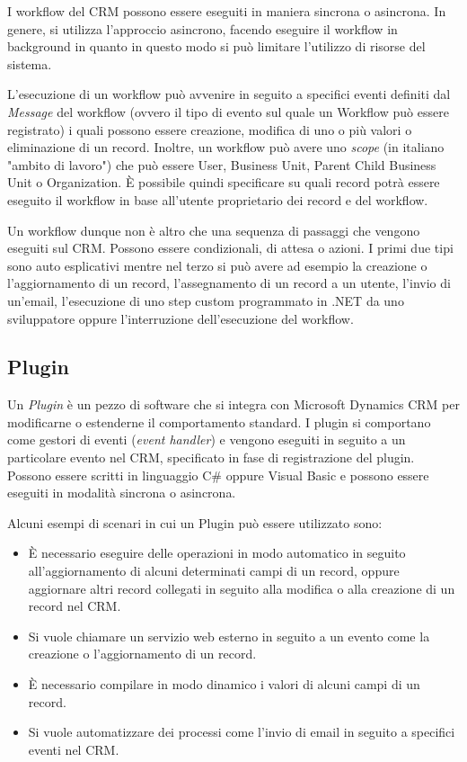 I workflow del CRM possono essere eseguiti in maniera sincrona o asincrona. In genere, si utilizza l'approccio asincrono, facendo eseguire il workflow in background in quanto in questo modo si può limitare l'utilizzo di risorse del sistema.

L'esecuzione di un workflow può avvenire in seguito a specifici eventi definiti dal \textit{Message} del workflow (ovvero il tipo di evento sul quale un Workflow può essere registrato) i quali possono essere creazione, modifica di uno o più valori o eliminazione di un record. Inoltre, un workflow può avere uno \textit{scope} (in italiano "ambito di lavoro") che può essere User, Business Unit, Parent Child Business Unit o Organization. È possibile quindi specificare su quali record potrà essere eseguito il workflow in base all'utente proprietario dei record e del workflow.

Un workflow dunque non è altro che una sequenza di passaggi che vengono eseguiti sul CRM. Possono essere condizionali, di attesa o azioni. I primi due tipi sono auto esplicativi mentre nel terzo si può avere ad esempio la creazione o l'aggiornamento di un record, l'assegnamento di un record a un utente, l'invio di un'email, l'esecuzione di uno step custom programmato in .NET da uno sviluppatore oppure l'interruzione dell'esecuzione del workflow.~\cite{DynamicsTutorialspoint}

\subsection{Plugin}
Un \textit{Plugin} è un pezzo di software che si integra con Microsoft Dynamics CRM per modificarne o estenderne il comportamento standard. I plugin si comportano come gestori di eventi (\textit{event handler}) e vengono eseguiti in seguito a un particolare evento nel CRM, specificato in fase di registrazione del plugin. Possono essere scritti in linguaggio C\# oppure Visual Basic e possono essere eseguiti in modalità sincrona o asincrona.

Alcuni esempi di scenari in cui un Plugin può essere utilizzato sono:
\begin{itemize}
  \item È necessario eseguire delle operazioni in modo automatico in seguito all'aggiornamento di alcuni determinati campi di un record, oppure aggiornare altri record collegati in seguito alla modifica o alla creazione di un record nel CRM.
  \item Si vuole chiamare un servizio web esterno in seguito a un evento come la creazione o l'aggiornamento di un record.
  \item È necessario compilare in modo dinamico i valori di alcuni campi di un record.
  \item Si vuole automatizzare dei processi come l'invio di email in seguito a specifici eventi nel CRM.
\end{itemize}

